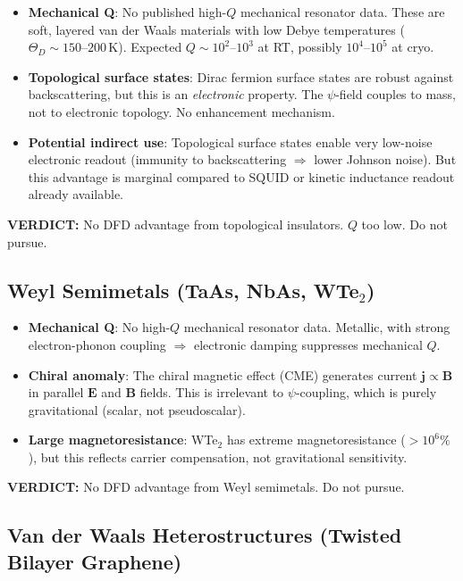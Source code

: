 \documentclass[11pt]{article}
\theoremstyle{remark}
\newcommand{\verdict}[1]{\textcolor{green!50!black}{\textbf{VERDICT:} #1}}
\begin{document}
\begin{itemize}[nosep]
  \item \textbf{Mechanical Q}: No published high-$Q$ mechanical resonator
    data. These are soft, layered van der Waals materials with low Debye
    temperatures ($\Theta_D \sim 150$--$200$\,K). Expected $Q \sim
    10^2$--$10^3$ at RT, possibly $10^4$--$10^5$ at cryo.
  \item \textbf{Topological surface states}: Dirac fermion surface
    states are robust against backscattering, but this is an
    \emph{electronic} property. The $\psi$-field couples to mass,
    not to electronic topology. No enhancement mechanism.
  \item \textbf{Potential indirect use}: Topological surface states
    enable very low-noise electronic readout (immunity to backscattering
    $\Rightarrow$ lower Johnson noise). But this advantage is marginal
    compared to SQUID or kinetic inductance readout already available.
\end{itemize}

\verdict{No DFD advantage from topological insulators. $Q$ too low.
Do not pursue.}

\subsection{Weyl Semimetals (TaAs, NbAs, WTe$_2$)}

\begin{itemize}[nosep]
  \item \textbf{Mechanical Q}: No high-$Q$ mechanical resonator data.
    Metallic, with strong electron-phonon coupling $\Rightarrow$
    electronic damping suppresses mechanical $Q$.
  \item \textbf{Chiral anomaly}: The chiral magnetic effect (CME)
    generates current $\mathbf{j} \propto \mathbf{B}$ in parallel
    $\mathbf{E}$ and $\mathbf{B}$ fields. This is irrelevant to
    $\psi$-coupling, which is purely gravitational (scalar, not
    pseudoscalar).
  \item \textbf{Large magnetoresistance}: WTe$_2$ has extreme
    magnetoresistance ($> 10^6\%$), but this reflects carrier
    compensation, not gravitational sensitivity.
\end{itemize}

\verdict{No DFD advantage from Weyl semimetals. Do not pursue.}

\subsection{Van der Waals Heterostructures (Twisted Bilayer Graphene)}
\end{document}
